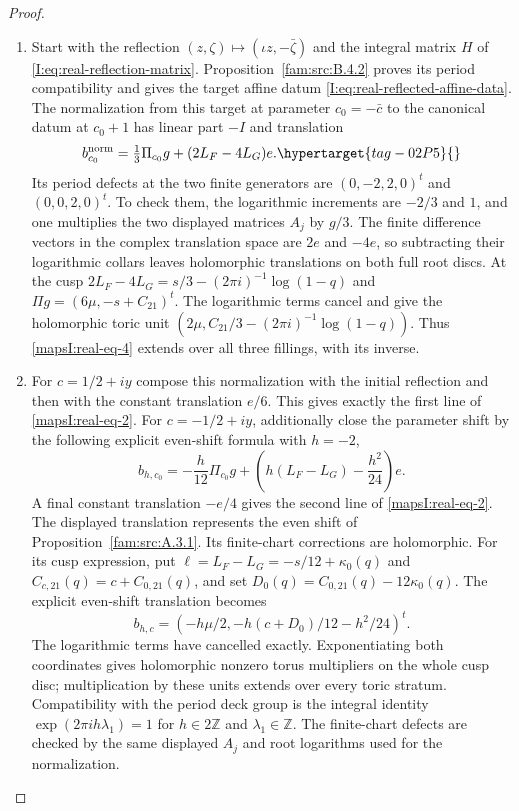 \begin{proof}
\begin{enumerate}[label=\arabic*.,leftmargin=*]
\item Start with the reflection $(z,\zeta)\mapsto(\iota z,-\bar\zeta)$
and the integral matrix $H$ of \eqref{I:eq:real-reflection-matrix}.
Proposition~\ref{fam:src:B.4.2} proves its period compatibility and gives
the target affine datum \eqref{I:eq:real-reflected-affine-data}.
The normalization from this
target at parameter $c_0=-\bar c$ to the canonical datum at $c_0+1$
has linear part $-I$ and translation
\[
 b^{\rm norm}_{c_0}=\tfrac13\Pi_{c_0}g+(2L_F-4L_G)e.
 \hypertarget{tag-02P5}{}\label{mapsI:real-eq-4}
\]
Its period defects at the two finite generators are
$(0,-2,2,0)^t$ and $(0,0,2,0)^t$. To check them, the logarithmic increments
are $-2/3$ and $1$, and one multiplies the two displayed matrices $A_j$
by $g/3$. The finite difference vectors in the complex translation space are $2e$ and $-4e$, so subtracting
their logarithmic collars leaves holomorphic translations on both full
root discs. At the cusp
$2L_F-4L_G=s/3-(2\pi i)^{-1}\log(1-q)$ and
$\Pi g=(6\mu,-s+C_{21})^t$. The logarithmic terms cancel and give the
holomorphic toric unit
$(2\mu,C_{21}/3-(2\pi i)^{-1}\log(1-q))$.
Thus \eqref{mapsI:real-eq-4} extends over all three fillings, with its inverse.

\item For $c=1/2+iy$ compose this normalization with the initial reflection
and then with the constant translation $e/6$. This gives exactly the
first line of \eqref{mapsI:real-eq-2}. For $c=-1/2+iy$, additionally close the parameter
shift by the following explicit even-shift formula with $h=-2$,
\[
 b_{h,c_0}=-\frac h{12}\Pi_{c_0}g+
 \left(h(L_F-L_G)-\frac{h^2}{24}\right)e.
\]
A final constant translation $-e/4$ gives the second line of \eqref{mapsI:real-eq-2}.
The displayed translation represents the even shift of Proposition~\ref{fam:src:A.3.1}. Its finite-chart corrections are holomorphic. For its cusp expression, put $\ell=L_F-L_G=-s/12+\kappa_0(q)$ and
$C_{c,21}(q)=c+C_{0,21}(q)$, and set
$D_0(q)=C_{0,21}(q)-12\kappa_0(q)$.
The explicit even-shift translation becomes
\[
 b_{h,c}=
 \left(-h\mu/2,-h(c+D_0)/12-h^2/24\right)^t.
\]
The logarithmic terms have cancelled exactly. Exponentiating both
coordinates gives holomorphic nonzero torus multipliers on the whole cusp
disc; multiplication by these units extends over every toric stratum.
Compatibility with the period deck group is the integral identity
$\exp(2\pi i h\lambda_1)=1$ for $h\in2\mathbb Z$ and
$\lambda_1\in\mathbb Z$. The finite-chart defects are checked by the
same displayed $A_j$ and root logarithms used for the normalization.


\end{enumerate}
\end{proof}
